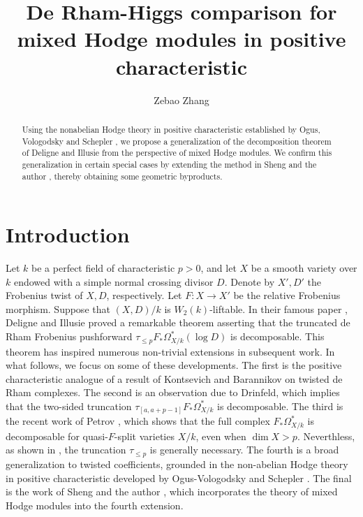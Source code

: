 \documentclass[12pt, a4paper]{article}
\title{De Rham-Higgs comparison for mixed Hodge modules in positive characteristic }
\author{Zebao Zhang}
\begin{document}
\theoremstyle{definition}
\newcommand{\Gr}{\mathrm{Gr}}
\newcommand{\dR}{\mathrm{dR}}
\newcommand{\Hig}{\mathrm{Hig}}
\newcommand{\Fil}{\mathrm{Fil}}






\maketitle
\begin{abstract}
Using the nonabelian Hodge theory in positive characteristic established by Ogus, Vologodsky and Schepler \cite{OV,Schepler}, we propose a generalization of the decomposition theorem of Deligne and Illusie \cite{DI} from the perspective of mixed Hodge modules. We confirm this generalization in certain special cases by extending the method in Sheng and the author \cite{SZ2}, thereby obtaining some geometric byproducts.
\end{abstract}
\section{Introduction}
Let $k$ be a perfect field of characteristic $p>0$, and let $X$ be a smooth variety over $k$ endowed with a simple normal crossing divisor $D$. Denote by $X',D'$ the Frobenius twist of $X,D$, respectively. Let $F:X\to X'$ be the relative Frobenius morphism. Suppose that $(X,D)/k$ is $W_2(k)$-liftable. In their famous paper \cite{DI}, Deligne and Illusie proved a remarkable theorem asserting that the truncated de Rham Frobenius pushforward $\tau_{\leq p}F_*\Omega^*_{X/k}(\log D)$ is decomposable. This theorem has inspired numerous non-trivial extensions in subsequent work. In what follows, we focus on some of these developments. The first is the positive characteristic analogue of a result of Kontsevich and Barannikov on twisted de Rham complexes. The second is an observation due to Drinfeld, which implies that the two-sided truncation $\tau_{[a,a+p-1]}F_*\Omega^*_{X/k}$ is decomposable. The third is the recent work of Petrov \cite{P2}, which shows that  the full complex $F_*\Omega^*_{X/k}$ is decomposable for quasi-$F$-split varieties $X/k$, even when $\dim X>p$. Neverthless, as shown in \cite{P1}, the truncation $\tau_{\leq p}$ is generally necessary. The fourth is a broad generalization to twisted coefficients, grounded in the non-abelian Hodge theory in positive characteristic developed by Ogus-Vologodsky \cite{OV} and Schepler \cite{Schepler}. The final is the work of Sheng and the author \cite{SZ2}, which incorporates the theory of mixed Hodge modules into the fourth extension. 
\end{document}
